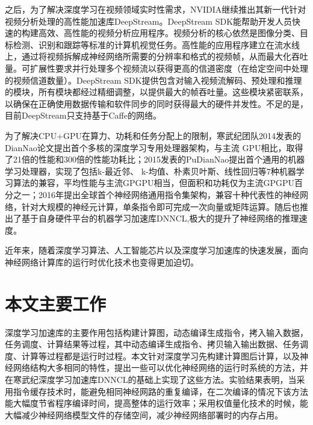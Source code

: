 之后，为了解决深度学习在视频领域实时性需求，NVIDIA继续推出其新一代针对视频分析处理的高性能加速库DeepStream\cite{deepstream}。DeepStream SDK能帮助开发人员快速的构建高效、高性能的视频分析应用程序。视频分析的核心依然是图像分类、目标检测、识别和跟踪等标准的计算机视觉任务。高性能的应用程序建立在流水线上，通过将视频拆解成神经网络所需要的分辨率和格式的视频帧，从而最大化吞吐量。可扩展性要求并行处理多个视频流以获得更高的信道密度（在给定空间中处理的视频信道数量）\cite{zhangwei}。DeepStream SDK提供包含对输入视频流解码、预处理和推理的模块，所有模块都经过精细调整，以提供最大的帧吞吐量\cite{lzl}。这些模块紧密联系，以确保在正确使用数据传输和软件同步的同时获得最大的硬件并发性。不足的是，目前DeepStream只支持基于Caffe的网络\cite{lgf}。

为了解决CPU+GPU在算力、功耗和任务分配上的限制，寒武纪团队2014发表的DianNao论文提出首个多核的深度学习专用处理器架构，与主流 GPU相比，取得了21倍的性能和300倍的性能功耗比\cite{chent}；2015发表的PuDianNao提出首个通用的机器学习处理器，实现了包括k-最近邻、 k-均值、朴素贝叶斯、线性回归等7种机器学习算法的兼容，平均性能与主流GPGPU相当，但面积和功耗仅为主流GPGPU百分之一\cite{liuD}；2016年提出全球首个神经网络通用指令集架构，兼容十种代表性的神经网络，针对大规模的神经元计算，单条指令即可完成一次向量或矩阵运算\cite{lius}。随后也推出了基于自身硬件平台的机器学习加速库DNNCL,极大的提升了神经网络的推理速度\cite{cheny}。

近年来，随着深度学习算法、人工智能芯片以及深度学习加速库的快速发展，面向神经网络计算库的运行时优化技术也变得更加迫切。

\section{本文主要工作}

深度学习加速库的主要作用包括构建计算图，动态编译生成指令，拷入输入数据，任务调度、计算结果等过程，其中动态编译生成指令、拷贝输入输出数据、任务调度、计算等过程都是运行时过程。本文针对深度学习先构建计算图后计算，以及神经网络结构大多相同的特性，提出一些可以优化神经网络的运行时系统的方法，并在寒武纪深度学习加速库DNNCL的基础上实现了这些方法。实验结果表明，当采用指令缓存技术时，能避免相同神经网路的重复编译，在二次编译的情况下该方法能大幅度节省程序编译时间，提高整体的运行效率；采用权值量化技术的时候，能大幅减少神经网络模型文件的存储空间，减少神经网络部署时的内存占用。

